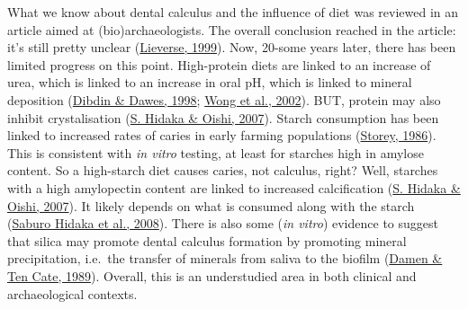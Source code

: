 \documentclass[
  b5paper,
]{book}
\begin{document}
What we know about dental calculus and the influence of diet was
reviewed in an article aimed at (bio)archaeologists. The overall
conclusion reached in the article: it's still pretty unclear
(\protect\hyperlink{ref-lieverseDietAetiology1999}{Lieverse, 1999}).
Now, 20-some years later, there has been limited progress on this point.
High-protein diets are linked to an increase of urea, which is linked to
an increase in oral pH, which is linked to mineral deposition
(\protect\hyperlink{ref-dibdinOralUrea1998}{Dibdin \& Dawes, 1998};
\protect\hyperlink{ref-wongCalciumPhosphate2002}{Wong et al., 2002}).
BUT, protein may also inhibit crystalisation
(\protect\hyperlink{ref-hidakaDietCalculus2007}{S. Hidaka \& Oishi,
2007}). Starch consumption has been linked to increased rates of caries
in early farming populations
(\protect\hyperlink{ref-storeyPaleopathologyOrigins1986}{Storey, 1986}).
This is consistent with \emph{in vitro} testing, at least for starches
high in amylose content. So a high-starch diet causes caries, not
calculus, right? Well, starches with a high amylopectin content are
linked to increased calcification
(\protect\hyperlink{ref-hidakaDietCalculus2007}{S. Hidaka \& Oishi,
2007}). It likely depends on what is consumed along with the starch
(\protect\hyperlink{ref-hidakaStarchRole2008}{Saburo Hidaka et al.,
2008}). There is also some (\emph{in vitro}) evidence to suggest that
silica may promote dental calculus formation by promoting mineral
precipitation, i.e.~the transfer of minerals from saliva to the biofilm
(\protect\hyperlink{ref-damenSilicicAcid1989}{Damen \& Ten Cate, 1989}).
Overall, this is an understudied area in both clinical and
archaeological contexts.
\end{document}
